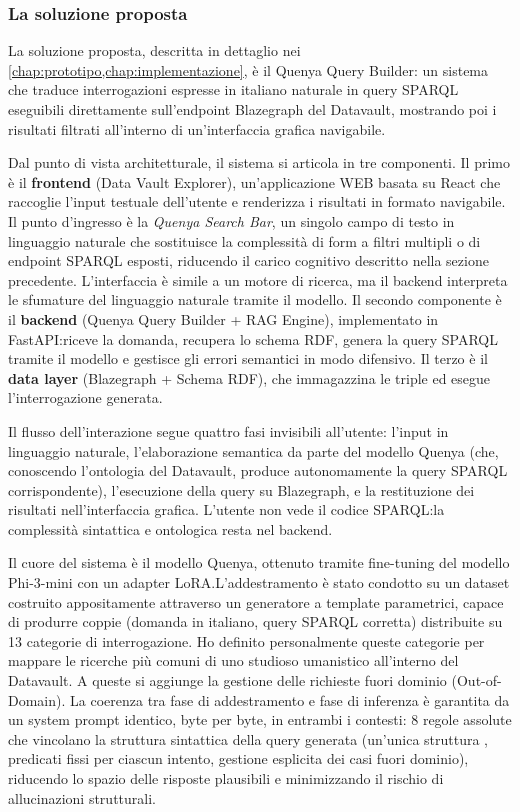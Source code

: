 \subsubsection{La soluzione proposta}

La soluzione proposta, descritta in dettaglio nei \cref{chap:prototipo,chap:implementazione}, è il Quenya Query Builder: un sistema che traduce interrogazioni espresse in italiano naturale in query SPARQL eseguibili direttamente sull'endpoint Blazegraph del Datavault, mostrando poi i risultati filtrati all'interno di un'interfaccia grafica navigabile.

Dal punto di vista architetturale, il sistema si articola in tre componenti. Il primo è il \textbf{frontend} (Data Vault Explorer), un'applicazione WEB basata su React che raccoglie l'input testuale dell'utente e renderizza i risultati in formato navigabile. Il punto d'ingresso è la \textit{Quenya Search Bar}, un singolo campo di testo in linguaggio naturale che sostituisce la complessità di form a filtri multipli o di endpoint SPARQL esposti, riducendo il carico cognitivo descritto nella sezione precedente. L'interfaccia è simile a un motore di ricerca, ma il backend interpreta le sfumature del linguaggio naturale tramite il modello. Il secondo componente è il \textbf{backend} (Quenya Query Builder + RAG Engine), implementato in FastAPI:\@ riceve la domanda, recupera lo schema RDF, genera la query SPARQL tramite il modello e gestisce gli errori semantici in modo difensivo. Il terzo è il \textbf{data layer} (Blazegraph + Schema RDF), che immagazzina le triple ed esegue l'interrogazione generata.

Il flusso dell'interazione segue quattro fasi invisibili all'utente: l'input in linguaggio naturale, l'elaborazione semantica da parte del modello Quenya (che, conoscendo l'ontologia del Datavault, produce autonomamente la query SPARQL corrispondente), l'esecuzione della query su Blazegraph, e la restituzione dei risultati nell'interfaccia grafica. L'utente non vede il codice SPARQL:\@ la complessità sintattica e ontologica resta nel backend.

Il cuore del sistema è il modello Quenya, ottenuto tramite fine-tuning del modello Phi-3-mini con un adapter LoRA.\@ L'addestramento è stato condotto su un dataset costruito appositamente attraverso un generatore a template parametrici, capace di produrre coppie (domanda in italiano, query SPARQL corretta) distribuite su 13 categorie di interrogazione. Ho definito personalmente queste categorie per mappare le ricerche più comuni di uno studioso umanistico all'interno del Datavault. A queste si aggiunge la gestione delle richieste fuori dominio (Out-of-Domain). La coerenza tra fase di addestramento e fase di inferenza è garantita da un system prompt identico, byte per byte, in entrambi i contesti: 8 regole assolute che vincolano la struttura sintattica della query generata (un'unica struttura , predicati fissi per ciascun intento, gestione esplicita dei casi fuori dominio), riducendo lo spazio delle risposte plausibili e minimizzando il rischio di allucinazioni strutturali.

